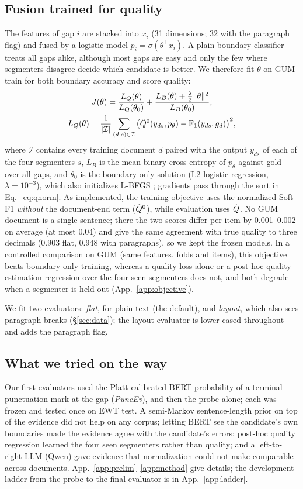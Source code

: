\subsection{Fusion trained for quality}
\label{sec:fusion}
The features of gap $i$ are stacked into $x_i$ (31 dimensions; 32 with the paragraph flag) and fused by a logistic model
$p_i = \sigma(\theta^{\top} x_i)$. A plain boundary classifier treats all gaps alike, although most gaps are easy and only
the few where segmenters disagree decide which candidate is better. We therefore fit $\theta$ on GUM train for both
boundary accuracy and score quality:
\begin{gather}
  J(\theta) = \frac{L_Q(\theta)}{L_Q(\theta_0)} + \frac{L_B(\theta) + \frac{\lambda}{2}\lVert\theta\rVert^2}{L_B(\theta_0)},
  \label{eq:objective}\\
  L_Q(\theta) = \frac{1}{|\mathcal{I}|}\sum_{(d,s)\in\mathcal{I}} \big(\tilde{Q}^{0}(y_{ds}, p_\theta) - \mathrm{F}_1(y_{ds}, g_d)\big)^2,
  \nonumber
\end{gather}
where $\mathcal{I}$ contains every training document $d$ paired with the output $y_{ds}$ of each of the four segmenters
$s$, $L_B$ is the mean binary cross-entropy of $p_\theta$ against gold over all gaps, and $\theta_0$ is the
boundary-only solution (L2 logistic regression, $\lambda = 10^{-3}$), which also initializes L-BFGS
\citep{liu-nocedal-1989-limited}; gradients pass through the sort in Eq.~\ref{eq:qnorm}. As implemented, the training
objective uses the normalized Soft F1 \emph{without} the document-end term ($\tilde{Q}^0$), while evaluation uses $\tilde{Q}$. No GUM
document is a single sentence; there the two scores differ per item by 0.001--0.002 on average (at most 0.04) and give the
same agreement with true quality to three decimals (0.903 flat, 0.948 with paragraphs), so we kept the frozen models.
In a controlled comparison on GUM (same features, folds and items), this objective beats boundary-only training, whereas
a quality loss alone or a post-hoc quality-estimation regression over the four seen segmenters does not, and both
degrade when a segmenter is held out (App.~\ref{app:objective}).

We fit two evaluators: \emph{flat}, for plain text (the default), and \emph{layout}, which also sees paragraph breaks
(\S\ref{sec:data}); the layout evaluator is lower-cased throughout and adds the paragraph flag.

\subsection{What we tried on the way}
\label{sec:tried}
Our first evaluators used the Platt-calibrated BERT probability of a terminal punctuation mark at the gap
(\emph{PuncEv}), and then the probe alone; each was frozen and tested once on EWT test. A semi-Markov sentence-length
prior on top of the evidence did not help on any corpus; letting BERT see the candidate's own boundaries made the
evidence agree with the candidate's errors; post-hoc quality regression learned the four seen segmenters rather than
quality; and a left-to-right LLM (Qwen) gave evidence that normalization could not make comparable across documents.
App.~\ref{app:prelim}--\ref{app:method} give details; the development ladder from the probe to the final evaluator is in
App.~\ref{app:ladder}.
